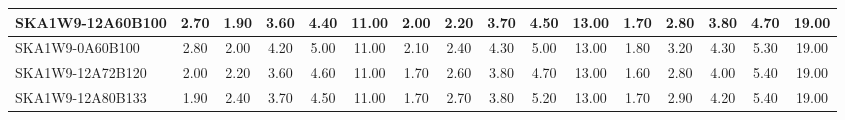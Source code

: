 \begin{table}[H]
{{\begin{tabular}{|lccccc||ccccc||ccccc|}
SKA1W9-12A60B100 & 2.70 \cellcolor{blue!40.40} & 1.90 \cellcolor{red!21.50} & 3.60 \cellcolor{green!24.00} & 4.40 \cellcolor{orange!18.00} & 11.00 \cellcolor{purple!60.00} & 2.00 \cellcolor{blue!32.00} & 2.20 \cellcolor{red!27.33} & 3.70 \cellcolor{green!18.00} & 4.50 \cellcolor{orange!18.00} & 13.00 \cellcolor{purple!18.00} & 1.70 \cellcolor{blue!22.67} & 2.80 \cellcolor{red!26.40} & 3.80 \cellcolor{green!25.00} & 4.70 \cellcolor{orange!30.60} & 19.00 \cellcolor{purple!60.00}\\ \hline 
SKA1W9-0A60B100 & 2.80 \cellcolor{blue!43.20} & 2.00 \cellcolor{red!25.00} & 4.20 \cellcolor{green!60.00} & 5.00 \cellcolor{orange!60.00} & 11.00 \cellcolor{purple!60.00} & 2.10 \cellcolor{blue!36.67} & 2.40 \cellcolor{red!36.67} & 4.30 \cellcolor{green!60.00} & 5.00 \cellcolor{orange!48.00} & 13.00 \cellcolor{purple!18.00} & 1.80 \cellcolor{blue!27.33} & 3.20 \cellcolor{red!60.00} & 4.30 \cellcolor{green!60.00} & 5.30 \cellcolor{orange!55.80} & 19.00 \cellcolor{purple!60.00}\\ \hline 
SKA1W9-12A72B120 & 2.00 \cellcolor{blue!20.80} & 2.20 \cellcolor{red!32.00} & 3.60 \cellcolor{green!24.00} & 4.60 \cellcolor{orange!32.00} & 11.00 \cellcolor{purple!60.00} & 1.70 \cellcolor{blue!18.00} & 2.60 \cellcolor{red!46.00} & 3.80 \cellcolor{green!25.00} & 4.70 \cellcolor{orange!30.00} & 13.00 \cellcolor{purple!18.00} & 1.60 \cellcolor{blue!18.00} & 2.80 \cellcolor{red!26.40} & 4.00 \cellcolor{green!39.00} & 5.40 \cellcolor{orange!60.00} & 19.00 \cellcolor{purple!60.00}\\ \hline 
SKA1W9-12A80B133 & 1.90 \cellcolor{blue!18.00} & 2.40 \cellcolor{red!39.00} & 3.70 \cellcolor{green!30.00} & 4.50 \cellcolor{orange!25.00} & 11.00 \cellcolor{purple!60.00} & 1.70 \cellcolor{blue!18.00} & 2.70 \cellcolor{red!50.67} & 3.80 \cellcolor{green!25.00} & 5.20 \cellcolor{orange!60.00} & 13.00 \cellcolor{purple!18.00} & 1.70 \cellcolor{blue!22.67} & 2.90 \cellcolor{red!34.80} & 4.20 \cellcolor{green!53.00} & 5.40 \cellcolor{orange!60.00} & 19.00 \cellcolor{purple!60.00}\\ \hline 
\end{tabular}}
\vspace{-0.300000cm}
\hspace{1cm} 
}
\end{table}
